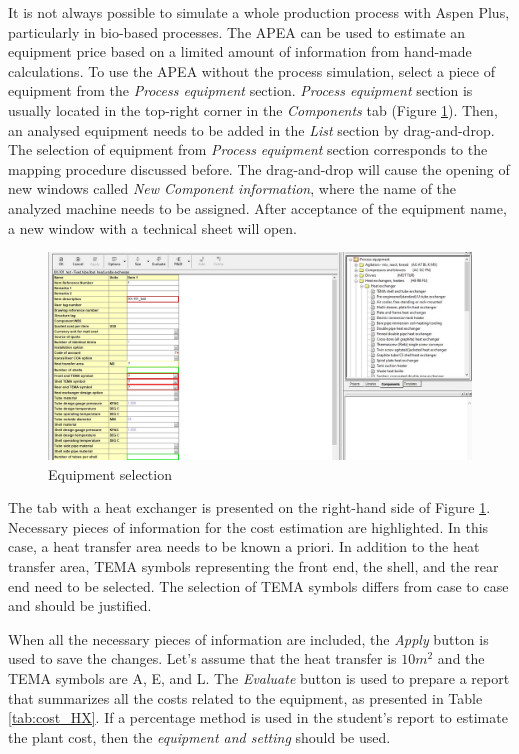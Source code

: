 	It is not always possible to simulate a whole production process with Aspen Plus, particularly in bio-based processes. The APEA can be used to estimate an equipment price based on a limited amount of information from hand-made calculations. To use the APEA without the process simulation, select a piece of equipment from the \textit{Process equipment} section. \textit{Process equipment} section is usually located in the top-right corner in the \textit{Components} tab (Figure \ref{fig:Equipment_selection}). Then, an analysed equipment needs to be added in the \textit{List} section by drag-and-drop. The selection of equipment from \textit{Process equipment} section corresponds to the mapping procedure discussed before. The drag-and-drop will cause the opening of new windows called \textit{New Component information}, where the name of the analyzed machine needs to be assigned. After acceptance of the equipment name, a new window with a technical sheet will open. 
	
	\begin{figure}[h!]
		\centering
		\includegraphics[trim = 0cm 0cm 0cm 0cm,clip, width=\textwidth]{Figures/Econmic_Analysis/HX.jpg}
		\caption{Equipment selection}
		\label{fig:Equipment_selection}
	\end{figure}

	The tab with a heat exchanger is presented on the right-hand side of Figure \ref{fig:Equipment_selection}. Necessary pieces of information for the cost estimation are highlighted. In this case, a heat transfer area needs to be known a priori. In addition to the heat transfer area, TEMA symbols representing the front end, the shell, and the rear end need to be selected. The selection of TEMA symbols differs from case to case and should be justified.
	
	When all the necessary pieces of information are included, the \textit{Apply} button is used to save the changes. Let's assume that the heat transfer is $10m^2$ and the TEMA symbols are A, E, and L. The \textit{Evaluate} button is used to prepare a report that summarizes all the costs related to the equipment, as presented in Table \ref{tab:cost_HX}. If a percentage method is used in the student's report to estimate the plant cost, then the \textit{equipment and setting} should be used.
	

